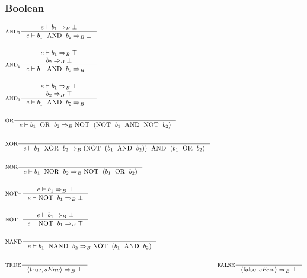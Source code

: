 \subsubsection{Boolean}
\begin{align*}
&\inference[$\text{AND}_1$]{e \vdash b_1 \Rightarrow_B \bot}
                           {e \vdash b_1 \Tand b_2 \Rightarrow_B \bot}
\\\\
&\inference[$\text{AND}_2$]{e \vdash b_1 \Rightarrow_B \top \\ b_2 \Rightarrow_B \bot}
                           {e \vdash b_1 \Tand b_2 \Rightarrow_B \bot}
\\\\
&\inference[$\text{AND}_3$]{e \vdash b_1 \Rightarrow_B \top \\ b_2 \Rightarrow_B \top}
                           {e \vdash b_1 \Tand b_2 \Rightarrow_B \top}
\\\\
&\inference[OR]{}
               {e \vdash b_1 \Tor b_2 \Rightarrow_B \Tnot(\Tnot b_1 \Tand \Tnot b_2)}
\\\\
&\inference[XOR]{}
                  {e \vdash b_1 \Txor b_2 \Rightarrow_B (\Tnot(b_1 \Tand b_2)) \Tand (b_1 \Tor b_2)}
\\\\
&\inference[NOR]{}
                {e \vdash b_1 \Tnor b_2 \Rightarrow_B \Tnot( b_1 \Tor b_2 )}
\\\\
&\inference[$\text{NOT}_\top$]{e \vdash b_1 \Rightarrow_B \top}
                              {e \vdash \Tnot b_1 \Rightarrow_B \bot}
\\\\
&\inference[$\text{NOT}_\bot$]{e \vdash b_1 \Rightarrow_B \bot}
                              {e \vdash \Tnot b_1 \Rightarrow_B \top}
\\\\
&\inference[NAND]{}
                   {e \vdash b_1 \Tnand b_2 \Rightarrow_B \Tnot( b_1 \Tand b_2 )}
\\\\
&\inference[TRUE]{}
                   {\Braket{\Ttrue,sEnv} \Rightarrow_B \top}
&\inference[FALSE]{}
                   {\Braket{\Tfalse,sEnv} \Rightarrow_B \bot}
\end{align*}
